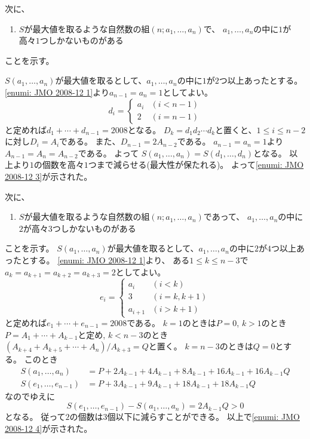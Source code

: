 \documentclass[uplatex, a5paper]{jsarticle}
\makeatletter
\theoremstyle{definition}
\renewenvironment{proof}[1][\proofname]{
  \pushQED{\qed}%
  \normalfont \topsep6\p@\@plus6\p@\relax
  \trivlist
  \item[\hskip\labelsep
    #1\@addpunct{\textbf{.}}]\ignorespaces
}{%
  \popQED\endtrivlist\@endpefalse
}
\providecommand{\proofname}{証明}
\def\qed{\hfill $\Box$}
\makeatother
\begin{document}
\begin{proof}
  次に、
  \begin{enumerate}[start=3]
    \item \label{enumi: JMO 2008-12 3}
    \(S\)が最大値を取るような自然数の組\((n ; a_1,\ldots ,a_n )\)で、
    \(a_1,\ldots ,a_n\)の中に\(1\)が高々\(1\)つしかないものがある
  \end{enumerate}
  ことを示す。

  \(S(a_1,\ldots,a_n)\)が最大値を取るとして、\(a_1,\ldots ,a_n\)の中に\(1\)が\(2\)つ以上あったとする。
  \ref{enumi: JMO 2008-12 1}より\(a_{n-1}=a_n=1\)としてよい。
  \[
  d_i=\begin{cases}
  a_i   & (i<n-1) \\
  2     & (i=n-1)
  \end{cases}
  \]
  と定めれば\(d_1+\cdots +d_{n-1}=2008\)となる。
  \(D_k=d_1d_2\cdots d_k\)と置くと、\(1\leq i \leq n-2\)に対し\(D_i=A_i\)である。
  また、\(D_{n-1}=2A_{n-2}\)である。
  \(a_{n-1}=a_n=1\)より\(A_{n-1}=A_n=A_{n-2}\)である。
  よって
  \(S(a_1,\ldots,a_n)=S(d_1,\ldots,d_n)\)となる。
  以上より\(1\)の個数を高々\(1\)つまで減らせる(最大性が保たれる)。
  よって\ref{enumi: JMO 2008-12 3}が示された。

  次に、
  \begin{enumerate}[start=4]
    \item \label{enumi: JMO 2008-12 4}
    \(S\)が最大値を取るような自然数の組\((n ; a_1,\ldots ,a_n )\)であって、
    \(a_1,\ldots ,a_n\)の中に\(2\)が高々\(3\)つしかないものがある
  \end{enumerate}
  ことを示す。
  \(S(a_1,\ldots,a_n)\)が最大値を取るとして、\(a_1,\ldots ,a_n\)の中に\(2\)が\(4\)つ以上あったとする。
  \ref{enumi: JMO 2008-12 1}より、
  ある\(1\leq k \leq n-3\)で\(a_k=a_{k+1}=a_{k+2}=a_{k+3}=2\)としてよい。
  \[
  e_i=\begin{cases}
  a_i     & ( i < k     ) \\
  3       & ( i = k,k+1 ) \\
  a_{i+1} & ( i > k+1   )
  \end{cases}
  \]
  と定めれば\(e_1+\cdots +e_{n-1}=2008\)である。
  \(k=1\)のときは\(P=0\),
  \(k>1\)のとき\(P=A_1+\cdots +A_{k-1}\)と定め,
  \(k<n-3\)のとき\((A_{k+4}+A_{k+5}+\cdots +A_n)/A_{k+3}=Q\)と置く。
  \(k=n-3\)のときは\(Q=0\)とする。
  このとき
  \begin{align*}
    S(a_1,\ldots ,a_n ) &= P+2A_{k-1}+4A_{k-1}+8A_{k-1}+16A_{k-1}+16A_{k-1}Q \\
    S(e_1,\ldots ,e_{n-1} ) &= P+3A_{k-1}+9A_{k-1}+18A_{k-1}+18A_{k-1}Q
  \end{align*}
  なのでゆえに
  \[
  S(e_1,\ldots ,e_{n-1} ) - S(a_1,\ldots ,a_n ) = 2A_{k-1}Q >0
  \]
  となる。
  従って\(2\)の個数は\(3\)個以下に減らすことができる。
  以上で\ref{enumi: JMO 2008-12 4}が示された。


\end{proof}
\end{document}
